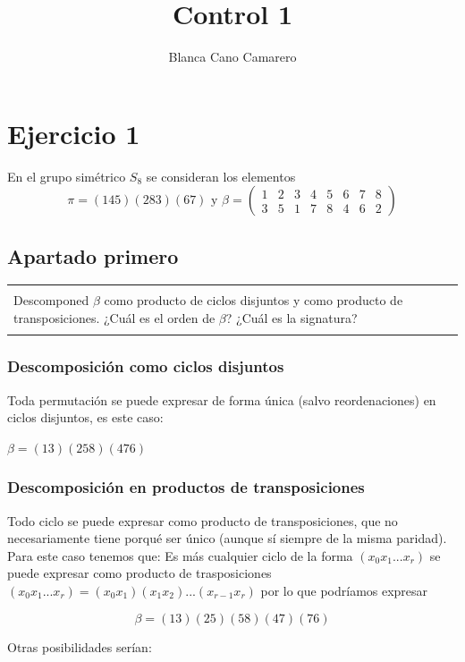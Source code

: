 \documentclass[12pt]{article}
\title{Control 1}
\author{Blanca Cano Camarero}
\newenvironment{micaja}
{
    \begin{center}
    \begin{tabular}{|p{0.9\textwidth}|}
    \hline\\
    }   
    {   
    \\\\\hline
    \end{tabular} 
    \end{center}
    }
\begin{document}
\begin{titlepage}
\maketitle
\tableofcontents
\end{titlepage}

\section{Ejercicio 1}
En el grupo simétrico $S_8$ se consideran los elementos
\begin{equation*}
    \pi = (145)(283)(67) \text{ y } 
    \beta = \begin{pmatrix}
      1 & 2 & 3 & 4 & 5 & 6 & 7 & 8 \\ 
        3 & 5 & 1 & 7 & 8 & 4 & 6 & 2      
    \end{pmatrix}
\end{equation*}
\subsection{Apartado primero}
\begin{micaja}
 Descomponed $\beta$ como producto de ciclos disjuntos y como producto de transposiciones. ¿Cuál es el orden de $\beta$? ¿Cuál es la signatura?
\end{micaja}

 \subsubsection*{Descomposición como ciclos disjuntos}
 Toda permutación se puede expresar de forma única (salvo reordenaciones) en ciclos disjuntos, es este caso:
 
$\beta = (1 3) (2 5 8) (4 7 6)$
\subsubsection*{Descomposición en productos de transposiciones}
Todo ciclo se puede expresar como producto de transposiciones, que no necesariamente tiene porqué ser único (aunque sí siempre de la misma paridad).
 Para este caso tenemos que:
Es más cualquier ciclo de la forma $(x_0 x_1...x_r)$ se puede expresar como producto de 
trasposiciones $(x_0 x_1...x_r) = (x_0 x_1)(x_1 x_2)...(x_{r-1}x_r)$
por lo que podríamos expresar 

$$\beta = (1 3)(2 5)(5 8) (4 7)(7 6)$$

Otras posibilidades serían: 
\end{document}
